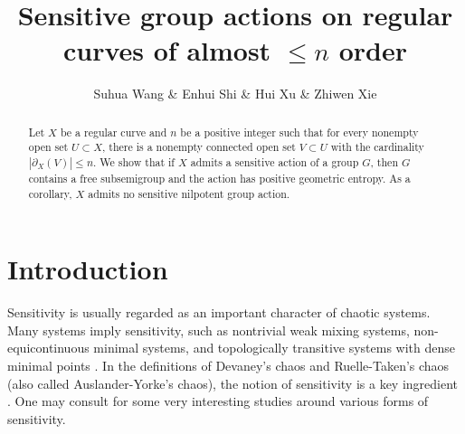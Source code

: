 \documentclass[12pt,a4paper]{amsart}
\theoremstyle{definition}
\numberwithin{equation}{section}
\begin{document}

\baselineskip=17pt



\title{Sensitive group actions on regular curves of almost $\leq n$ order}

\author{Suhua Wang \& Enhui Shi \& Hui Xu \& Zhiwen Xie}

\address[S.H. Wang]{Zhangjiagang Campus, Jiangsu University of Science and Technology, Zhangjiagang 215600, P. R. China}

\address[E.H. Shi]{School of Mathematical Sciences, Soochow University, Suzhou 215006, P. R. China}

\address[H. Xu]{School of Mathematical Sciences, Soochow University, Suzhou 215006, P. R. China}

\address[Z.W. Xie]{School of Mathematical Sciences, Soochow University, Suzhou 215006, P. R. China}

\begin{abstract}
Let $X$ be a regular curve and $n$ be a positive integer such that for every nonempty open set $U\subset X$, there is
a nonempty connected open set $V\subset U$ with the cardinality $|\partial_X(V)|\leq n$. We show that if $X$ admits a sensitive action of
a group $G$, then $G$ contains a free subsemigroup and the action has positive geometric entropy. As a corollary, $X$ admits no sensitive nilpotent group action.
\end{abstract}


\maketitle

\pagestyle{myheadings} 

\section{Introduction}

Sensitivity is usually regarded as an important character of chaotic systems. Many systems imply sensitivity, such as nontrivial
weak mixing systems, non-equicontinuous minimal systems, and topologically transitive systems with dense minimal points \cite{GW}.
In the definitions of Devaney's chaos and Ruelle-Taken's chaos (also called Auslander-Yorke's chaos),
the notion of sensitivity is a key ingredient \cite{AY,De}. One may consult \cite{AK,LTY,SY,Su,Ye} for some very interesting studies around
various forms of sensitivity.
\end{document}
